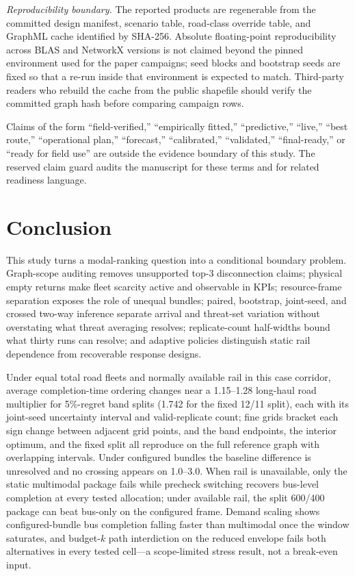 \documentclass{ieeeaccess}
\begin{document}
\emph{Reproducibility boundary.} The reported products are regenerable from the committed design manifest, scenario table, road-class override table, and GraphML cache identified by SHA-256. Absolute floating-point reproducibility across BLAS and NetworkX versions is not claimed beyond the pinned environment used for the paper campaigns; seed blocks and bootstrap seeds are fixed so that a re-run inside that environment is expected to match. Third-party readers who rebuild the cache from the public shapefile should verify the committed graph hash before comparing campaign rows.

Claims of the form ``field-verified,'' ``empirically fitted,'' ``predictive,'' ``live,'' ``best route,'' ``operational plan,'' ``forecast,'' ``calibrated,'' ``validated,'' ``final-ready,'' or ``ready for field use'' are outside the evidence boundary of this study. The reserved claim guard audits the manuscript for these terms and for related readiness language.

\section{Conclusion}
\label{sec:conclusion}
This study turns a modal-ranking question into a conditional boundary problem. Graph-scope auditing removes unsupported top-3 disconnection claims; physical empty returns make fleet scarcity active and observable in KPIs; resource-frame separation exposes the role of unequal bundles; paired, bootstrap, joint-seed, and crossed two-way inference separate arrival and threat-set variation without overstating what threat averaging resolves; replicate-count half-widths bound what thirty runs can resolve; and adaptive policies distinguish static rail dependence from recoverable response designs.

Under equal total road fleets and normally available rail in this case corridor, average completion-time ordering changes near a 1.15--1.28 long-haul road multiplier for 5\%-regret band splits (1.742 for the fixed 12/11 split), each with its joint-seed uncertainty interval and valid-replicate count; fine grids bracket each sign change between adjacent grid points, and the band endpoints, the interior optimum, and the fixed split all reproduce on the full reference graph with overlapping intervals. Under configured bundles the baseline difference is unresolved and no crossing appears on 1.0--3.0. When rail is unavailable, only the static multimodal package fails while precheck switching recovers bus-level completion at every tested allocation; under available rail, the split 600/400 package can beat bus-only on the configured frame. Demand scaling shows configured-bundle bus completion falling faster than multimodal once the window saturates, and budget-$k$ path interdiction on the reduced envelope fails both alternatives in every tested cell---a scope-limited stress result, not a break-even input.
\end{document}
